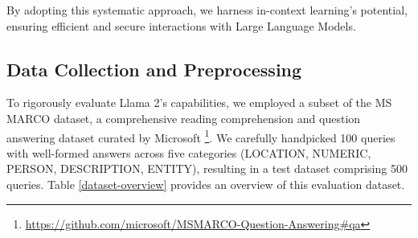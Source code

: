 \documentclass[conference]{IEEEtran}
\begin{document}

By adopting this systematic approach, we harness in-context learning's potential, ensuring efficient and secure interactions with Large Language Models.

\subsection{Data Collection and Preprocessing}
To rigorously evaluate Llama 2's capabilities, we employed a subset of the MS MARCO dataset, a comprehensive reading comprehension and question answering dataset curated by Microsoft \footnote{\url{https://github.com/microsoft/MSMARCO-Question-Answering\#qa}}. We carefully handpicked 100 queries with well-formed answers across five categories (LOCATION, NUMERIC, PERSON, DESCRIPTION, ENTITY), resulting in a test dataset comprising 500 queries. Table \ref{dataset-overview} provides an overview of this evaluation dataset.

\end{document}
